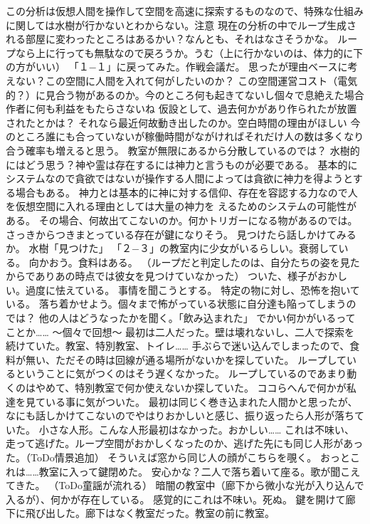 \documentclass[uplatex]{utbook}
\begin{document}
この分析は仮想人間を操作して空間を高速に探索するものなので、特殊な仕組みに関しては水樹が行かないとわからない。注意
現在の分析の中でループ生成される部屋に変わったところはあるかい？なんとも、それはなさそうかな。
ループなら上に行っても無駄なので戻ろうか。うむ（上に行かないのは、体力的に下の方がいい）
「１−１」に戻ってみた。作戦会議だ。
思ったが理由ベースに考えない？この空間に人間を入れて何がしたいのか？
この空間運営コスト（電気的？）に見合う物があるのか。今のところ何も起きてないし個々で息絶えた場合作者に何も利益をもたらさないね
仮設として、過去何かがあり作られたが放置されたとかは？
それなら最近何故動き出したのか。空白時間の理由がほしい
今のところ誰にも合っていないが稼働時間がながければそれだけ人の数は多くなり合う確率も増えると思う。
教室が無限にあるから分散しているのでは？
水樹的にはどう思う？神や霊は存在するには神力と言うものが必要である。
基本的にシステムなので貪欲ではないが操作する人間によっては貪欲に神力を得ようとする場合もある。
神力とは基本的に神に対する信仰、存在を容認する力なので人を仮想空間に入れる理由としては大量の神力を
えるためのシステムの可能性がある。
その場合、何故出てこないのか。何かトリガーになる物があるのでは。
さっきからつきまとっている存在が鍵になりそう。
見つけたら話しかけてみるか。
水樹「見つけた」
「２−３」の教室内に少女がいるらしい。衰弱している。
向かおう。食料はある。
（ループだと判定したのは、自分たちの姿を見たからでありあの時点では彼女を見つけていなかった）
ついた、様子がおかしい。過度に怯えている。
事情を聞こうとする。
特定の物に対し、恐怖を抱いている。
落ち着かせよう。個々まで怖がっている状態に自分達も陥ってしまうのでは？
他の人はどうなったかを聞く。「飲み込まれた」
でかい何かがいるってことか……
〜個々で回想〜
最初は二人だった。壁は壊れないし、二人で探索を続けていた。教室、特別教室、トイレ……
手ぶらで迷い込んでしまったので、食料が無い、ただその時は回線が通る場所がないかを探していた。
ループしているということに気がつくのはそう遅くなかった。
ループしているのであまり動くのはやめて、特別教室で何か使えないか探していた。
ココらへんで何かが私達を見ている事に気がついた。
最初は同じく巻き込まれた人間かと思ったが、なにも話しかけてこないのでやはりおかしいと感じ、振り返ったら人形が落ちていた。
小さな人形。こんな人形最初はなかった。おかしい……
これは不味い、走って逃げた。ループ空間がおかしくなったのか、逃げた先にも同じ人形があった。（ToDo情景追加）
そういえば窓から同じ人の顔がこちらを覗く。
おっとこれは……教室に入って鍵閉めた。
安心かな？二人で落ち着いて座る。歌が聞こえてきた。
（ToDo童謡が流れる）
暗闇の教室中（廊下から微小な光が入り込んで入るが）、何かが存在している。
感覚的にこれは不味い。死ぬ。
鍵を開けて廊下に飛び出した。廊下はなく教室だった。教室の前に教室。
\end{document}
